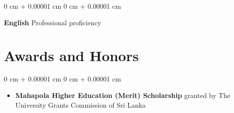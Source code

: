 \documentclass[10pt, letterpaper]{article}
\newenvironment{highlights}{
    \begin{itemize}[
        topsep=0.10 cm,
        parsep=0.10 cm,
        partopsep=0pt,
        itemsep=0pt,
        leftmargin=0 cm + 10pt
    ]
}{
    \end{itemize}
} %
\newenvironment{onecolentry}{
    \begin{adjustwidth}{
        0 cm + 0.00001 cm
    }{
        0 cm + 0.00001 cm
    }
}{
    \end{adjustwidth}
} %
\newenvironment{twocolentry}[2][]{
    \onecolentry
    \def\secondColumn{#2}
    \setcolumnwidth{\fill, 4.5 cm}
    \begin{paracol}{2}
}{
    \switchcolumn \raggedleft \secondColumn
    \end{paracol}
    \endonecolentry
} %
\begin{document}
        \vspace{0.30 cm}
        \begin{twocolentry}{
            Professional proficiency
        }
            \textbf{English}\end{twocolentry}

    \section{Awards and Honors}
        
        \begin{onecolentry}
            \begin{highlights}
                \item \textbf{Mahapola Higher Education (Merit) Scholarship} granted by The University Grants Commission of Sri Lanka
            \end{highlights}
        \end{onecolentry}
\end{document}
